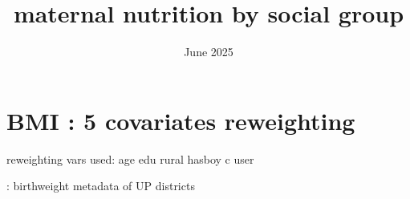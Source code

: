 \documentclass{article}
\title{maternal nutrition by social group}
\date{June 2025}
\begin{document}
\maketitle


\section{BMI : 5 covariates reweighting }

reweighting vars used: age edu rural hasboy c user

\begin{table}[H]
    \centering
    \footnotesize %
    \caption{: birthweight metadata of UP districts}
    \label{tab:sumstat}
\end{table}




\end{document}
